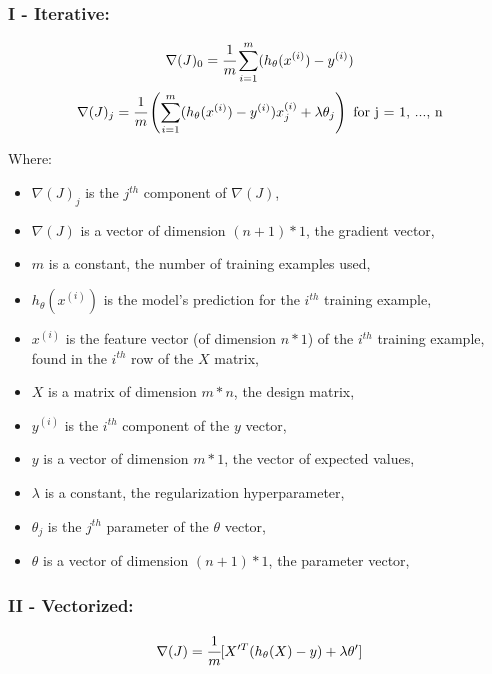 \documentclass[]{article}
\begin{document}
\hypertarget{i---iterative-1}{%
\subsubsection{I - Iterative:}\label{i---iterative-1}}

\large

\[
\nabla(J)_0 = \cfrac{1}{m}\sum_{i=1}^{m}(h_\theta(x^{(i)}) - y^{(i)})
\] \normalsize \large \[
\nabla(J)_j = \cfrac{1}{m}\left(\sum_{i=1}^{m}(h_\theta(x^{(i)}) - y^{(i)})x_j^{(i)} + \lambda \theta_j\right) \text{ for j = 1, ..., n}
\] \normalsize

Where:

\begin{itemize}
\item
  \(\nabla(J)_j\) is the \(j^{th}\) component of \(\nabla(J)\),
\item
  \(\nabla(J)\) is a vector of dimension \((n + 1) * 1\), the gradient
  vector,
\item
  \(m\) is a constant, the number of training examples used,
\item
  \(h_\theta(x^{(i)})\) is the model's prediction for the \(i^{th}\)
  training example,
\item
  \(x^{(i)}\) is the feature vector (of dimension \(n * 1\)) of the
  \(i^{th}\) training example, found in the \(i^{th}\) row of the \(X\)
  matrix,
\item
  \(X\) is a matrix of dimension \(m * n\), the design matrix,
\item
  \(y^{(i)}\) is the \(i^{th}\) component of the \(y\) vector,
\item
  \(y\) is a vector of dimension \(m * 1\), the vector of expected
  values,
\item
  \(\lambda\) is a constant, the regularization hyperparameter,
\item
  \(\theta_j\) is the \(j^{th}\) parameter of the \(\theta\) vector,
\item
  \(\theta\) is a vector of dimension \((n + 1) * 1\), the parameter
  vector,
\end{itemize}

\hypertarget{ii---vectorized-2}{%
\subsubsection{II - Vectorized:}\label{ii---vectorized-2}}

\large

\[
\nabla(J) = \cfrac{1}{m} [X'^T(h_\theta(X) - y) + \lambda \theta']
\] \normalsize
\end{document}
